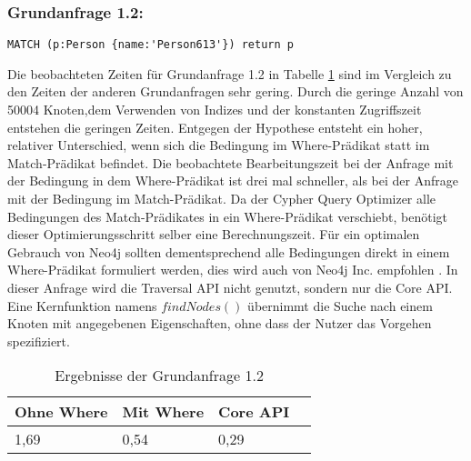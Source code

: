  \subsubsection{Grundanfrage 1.2:}
 \begin{Verbatim}[frame=single]
 MATCH (p:Person {name:'Person613'}) return p
 \end{Verbatim}
  Die beobachteten Zeiten für Grundanfrage 1.2 in Tabelle \ref{tab:Query1_2} sind im Vergleich zu den Zeiten der anderen Grundanfragen sehr gering. Durch die geringe Anzahl von 50004 Knoten,dem Verwenden von Indizes und der konstanten Zugriffszeit entstehen die geringen Zeiten. \newline Entgegen der Hypothese entsteht ein hoher, relativer Unterschied, wenn sich die Bedingung im Where-Prädikat statt im Match-Prädikat 	befindet. Die beobachtete Bearbeitungszeit bei der Anfrage mit der Bedingung in dem Where-Prädikat ist drei mal schneller, als bei der Anfrage mit der Bedingung im Match-Prädikat. Da der Cypher Query Optimizer alle Bedingungen des Match-Prädikates in ein Where-Prädikat verschiebt, benötigt dieser Optimierungsschritt selber eine  Berechnungszeit. Für ein optimalen Gebrauch von Neo4j sollten dementsprechend alle Bedingungen direkt in einem Where-Prädikat formuliert werden, dies wird auch von Neo4j Inc. empfohlen \parencite{Optimizer}. \newline
In dieser Anfrage wird die Traversal API nicht genutzt, sondern nur die Core API. Eine Kernfunktion namens $findNodes()$ übernimmt die Suche nach einem Knoten mit angegebenen Eigenschaften, ohne dass der Nutzer das Vorgehen spezifiziert.  
\FloatBarrier
\begin{table}[h]
	\centering
		\begin{tabular}{ |p{3cm}|p{3cm}|p{3cm}|p{3cm}|  }
			\hline
			Ohne Where& Mit Where& Core API  \\
			\hline
			1,69   &  0,54  & 0,29  \\
			\hline
		\end{tabular}
		\FloatBarrier
		\caption{Ergebnisse der Grundanfrage 1.2}
		\label{tab:Query1_2}
\end{table}
 \vskip 2.5cm
